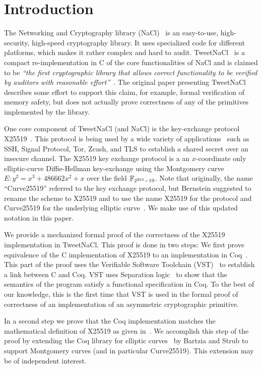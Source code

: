 \section{Introduction}
\label{sec:intro}

The Networking and Cryptography library (NaCl)~\cite{BLS12}
is an easy-to-use, high-security, high-speed cryptography library.
It uses specialized code for different platforms, which makes it rather complex and hard to audit.
TweetNaCl~\cite{BGJ+15} is a compact re-implementation in C
of the core functionalities of NaCl and is claimed to be
\emph{``the first cryptographic library that allows correct functionality
to be verified by auditors with reasonable effort''}~\cite{BGJ+15}.
The original paper presenting TweetNaCl describes some effort to support
this claim, for example, formal verification of memory safety, but does not actually
prove correctness of any of the primitives implemented by the library.

One core component of TweetNaCl (and NaCl) is the key-exchange protocol X25519~\cite{rfc7748}.
This protocol is being used by a wide variety of applications~\cite{things-that-use-curve25519}
such as SSH, Signal Protocol, Tor, Zcash, and TLS to establish a shared secret over
an insecure channel.
The X25519 key exchange protocol is a an $x$-coordinate only
elliptic-curve Diffie-Hellman key-exchange using the Montgomery
curve $E: y^2 = x^3 + 486662 x^2 + x$ over the field $\mathbb{F}_{2^{255}-19}$.
Note that originally, the name ``Curve25519'' referred to the key exchange protocol,
but Bernstein suggested to rename the scheme to X25519 and to use the name
X25519 for the protocol and Curve25519 for the underlying elliptic curve~\cite{Ber14}.
We make use of this updated notation in this paper.

We provide a mechanized formal proof of the correctness of the X25519
implementation in TweetNaCl.
This proof is done in two steps:
We first prove equivalence of the C implementation of X25519
to an implementation in Coq~\cite{coq-faq}.
This part of the proof uses the Verifiable Software Toolchain (VST)~\cite{2012-Appel}
to establish a link between C and Coq.
VST uses Separation logic~\cite{1969-Hoare,Reynolds02separationlogic}
to show that the semantics of the program satisfy a functional specification in Coq.
To the best of our knowledge, this is the first time that
VST is used in the formal proof of correctness of an implementation
of an asymmetric cryptographic primitive.

In a second step we prove that the Coq implementation matches
the mathematical definition of X25519 as given in~\cite[Sec.~2]{Ber06}.
We accomplish this step of the proof by extending the Coq library
for elliptic curves~\cite{DBLP:conf/itp/BartziaS14} by Bartzia and Strub to
support Montgomery curves (and in particular Curve25519).
This extension may be of independent interest.

